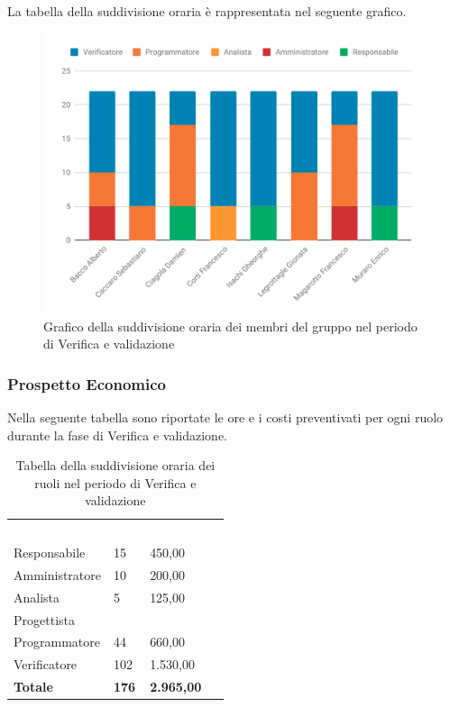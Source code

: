 La tabella della suddivisione oraria è rappresentata nel seguente grafico.
\begin{figure}[H]
	\includegraphics[width=1\linewidth]{Preventivo/grafici/VV1.pdf}
	\caption{Grafico della suddivisione oraria dei membri del gruppo nel periodo di Verifica e validazione}
\end{figure}

\subsubsection{Prospetto Economico}
Nella seguente tabella sono riportate le ore e i costi preventivati per ogni ruolo durante la fase di Verifica e validazione.


\begin{table}[H]	
	\begin{center}
	    \begin{tabular}{C{4cm}C{1cm}C{3,5cm}}
			\textcolor{white}{\textbf{Ruolo}} & \textcolor{white}{\textbf{Ore}} & \textcolor{white}{\textbf{Costo in €}}
			\\
			Responsabile & 15 & 450,00 \\
			Amministratore & 10 & 200,00 \\
			Analista & 5 & 125,00 \\
			Progettista &  & \space \\
			Programmatore & 44 & 660,00 \\
			Verificatore & 102 & 1.530,00 \\
			\textbf{Totale} & \textbf{176} & \textbf{2.965,00} \\
		\end{tabular}
	    \caption{Tabella della suddivisione oraria dei ruoli nel periodo di Verifica e validazione} \label{tab:tabellaRuoliVerifica e validazione} 
	\end{center}
\end{table}


